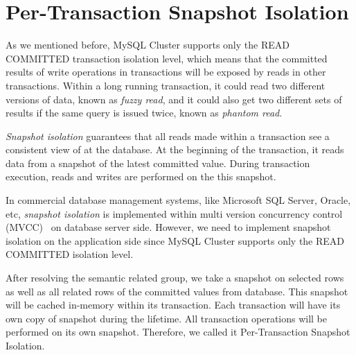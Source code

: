 \section{Per-Transaction Snapshot Isolation}

As we mentioned before, MySQL Cluster supports only the READ COMMITTED transaction isolation level, which means that the committed results of write operations in transactions will be exposed by reads in other transactions. Within a long running transaction, it could read two different versions of data, known as \textit{fuzzy read}, and it could also get two different sets of results if the same query is issued twice, known as \textit{phantom read}.

\noindent \textit{Snapshot isolation} guarantees that all reads made within a transaction see a consistent view of at the database. At the beginning of the transaction, it reads data from a snapshot of the latest committed value. During transaction execution, reads and writes are performed on the this snapshot.

\noindent In commercial database management systems, like Microsoft SQL Server, Oracle, etc, \textit{snapshot isolation} is implemented within multi version concurrency control (MVCC)~\cite{berenson1995critique} on database server side. However, we need to implement snapshot isolation on the application side since MySQL Cluster supports only the READ COMMITTED isolation level.

\noindent After resolving the semantic related group, we take a snapshot on selected rows as well as all related rows of the committed values from database. This snapshot will be cached in-memory within its transaction. Each transaction will have its own copy of snapshot during the lifetime. All transaction operations will be performed on its own snapshot. Therefore, we called it Per-Transaction Snapshot Isolation.

